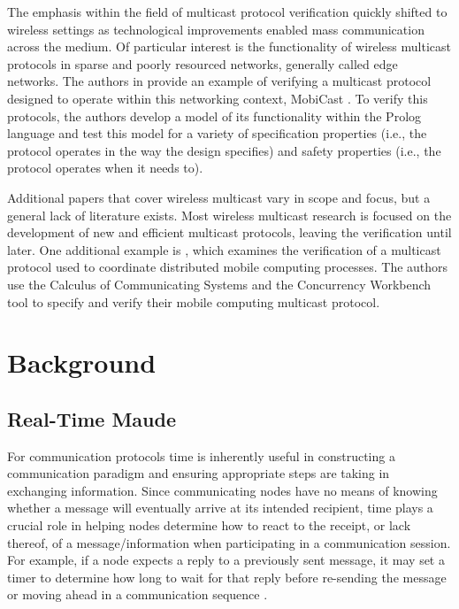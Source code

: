\documentclass[10pt, journal]{IEEEtran}
\begin{document}
The emphasis within the field of multicast protocol verification quickly shifted to wireless settings as technological improvements enabled mass communication across the medium. Of particular interest is the functionality of wireless multicast protocols in sparse and poorly resourced networks, generally called edge networks. The authors in \cite{Borujerdi2004} provide an example of verifying a multicast protocol designed to operate within this networking context, MobiCast \cite{Tan2000}. To verify this protocols, the authors develop a model of its functionality within the Prolog language and test this model for a variety of specification properties (i.e., the protocol operates in the way the design specifies) and safety properties (i.e., the protocol operates when it needs to). 

Additional papers that cover wireless multicast vary in scope and focus, but a general lack of literature exists. Most wireless multicast research is focused on the development of new and efficient multicast protocols, leaving the verification until later. One additional example is \cite{Anastasi2000}, which examines the verification of a multicast protocol used to coordinate distributed mobile computing processes. The authors use the Calculus of Communicating Systems \cite{Milner1989} and the Concurrency Workbench tool \cite{Cleaveland1996} to specify and verify their mobile computing multicast protocol. 

\section{Background}

\subsection{Real-Time Maude}

For communication protocols time is inherently useful in constructing a communication paradigm and ensuring appropriate steps are taking in exchanging information. Since communicating nodes have no means of knowing whether a message will eventually arrive at its intended recipient, time plays a crucial role in helping nodes determine how to react to the receipt, or lack thereof, of a message/information when participating in a communication session. For example, if a node expects a reply to a previously sent message, it may set a timer to determine how long to wait for that reply before re-sending the message or moving ahead in a communication sequence \cite{Lien2004}.
\end{document}
